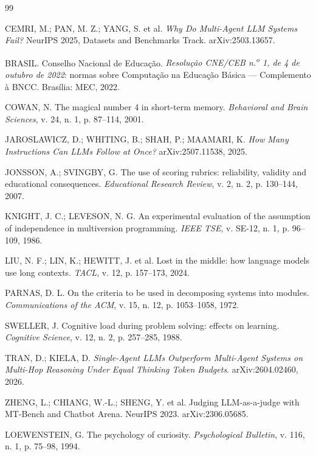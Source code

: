 \documentclass[11pt,a4paper]{article}
\begin{document}
\begin{thebibliography}{99}

CEMRI, M.; PAN, M. Z.; YANG, S. et al. \textit{Why Do Multi-Agent LLM Systems Fail?}
NeurIPS 2025, Datasets and Benchmarks Track. arXiv:2503.13657.

BRASIL. Conselho Nacional de Educação. \textit{Resolução CNE/CEB n.\textsuperscript{o} 1, de 4
de outubro de 2022}: normas sobre Computação na Educação Básica --- Complemento à BNCC.
Brasília: MEC, 2022.

COWAN, N. The magical number 4 in short-term memory. \textit{Behavioral and Brain Sciences},
v. 24, n. 1, p. 87--114, 2001.

JAROSLAWICZ, D.; WHITING, B.; SHAH, P.; MAAMARI, K. \textit{How Many Instructions Can LLMs
Follow at Once?} arXiv:2507.11538, 2025.

JONSSON, A.; SVINGBY, G. The use of scoring rubrics: reliability, validity and educational
consequences. \textit{Educational Research Review}, v. 2, n. 2, p. 130--144, 2007.

KNIGHT, J. C.; LEVESON, N. G. An experimental evaluation of the assumption of independence in
multiversion programming. \textit{IEEE TSE}, v. SE-12, n. 1, p. 96--109, 1986.

LIU, N. F.; LIN, K.; HEWITT, J. et al. Lost in the middle: how language models use long
contexts. \textit{TACL}, v. 12, p. 157--173, 2024.

PARNAS, D. L. On the criteria to be used in decomposing systems into modules.
\textit{Communications of the ACM}, v. 15, n. 12, p. 1053--1058, 1972.

SWELLER, J. Cognitive load during problem solving: effects on learning.
\textit{Cognitive Science}, v. 12, n. 2, p. 257--285, 1988.

TRAN, D.; KIELA, D. \textit{Single-Agent LLMs Outperform Multi-Agent Systems on Multi-Hop
Reasoning Under Equal Thinking Token Budgets}. arXiv:2604.02460, 2026.

ZHENG, L.; CHIANG, W.-L.; SHENG, Y. et al. Judging LLM-as-a-judge with MT-Bench and Chatbot
Arena. NeurIPS 2023. arXiv:2306.05685.

LOEWENSTEIN, G. The psychology of curiosity. \textit{Psychological Bulletin}, v. 116, n. 1,
p. 75--98, 1994.


\end{thebibliography}
\end{document}
